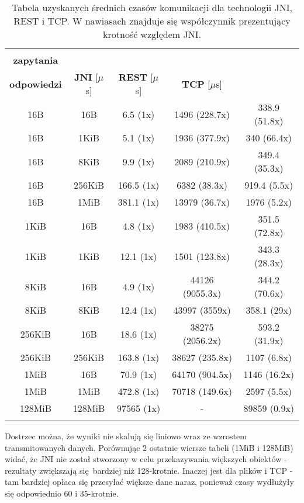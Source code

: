 \begin{longtable}{|c|c|c|c|c|}
    \hline
    \begin{tabular}{@{}c@{}} \textbf{Rozmiar} \\ \textbf{zapytania} \end{tabular} & \begin{tabular}{@{}c@{}} \textbf{Rozmiar} \\ \textbf{odpowiedzi} \end{tabular} & \textbf{JNI} [$\mu$s] & \textbf{REST} [$\mu$s] & \textbf{TCP} [$\mu$s] \\
    \hline
    16B & 16B & 6.5 (1x) & 1496 (228.7x) & 338.9 (51.8x) \\
    16B & 1KiB & 5.1 (1x) & 1936 (377.9x) & 340 (66.4x) \\
    16B & 8KiB & 9.9 (1x) & 2089 (210.9x) & 349.4 (35.3x) \\
    16B & 256KiB & 166.5 (1x) & 6382 (38.3x) & 919.4 (5.5x) \\
    16B & 1MiB & 381.1 (1x) & 13979 (36.7x) & 1976 (5.2x) \\
    1KiB & 16B & 4.8 (1x) & 1983 (410.5x) & 351.5 (72.8x) \\
    1KiB & 1KiB & 12.1 (1x) & 1501 (123.8x) & 343.3 (28.3x) \\
    8KiB & 16B & 4.9 (1x) & 44126 (9055.3x) & 344.2 (70.6x) \\
    8KiB & 8KiB & 12.4 (1x) & 43997 (3559x) & 358.1 (29x) \\
    256KiB & 16B & 18.6 (1x) & 38275 (2056.2x) & 593.2 (31.9x) \\
    256KiB & 256KiB & 163.8 (1x) & 38627 (235.8x) & 1107 (6.8x) \\
    1MiB & 16B & 70.9 (1x) & 64170 (904.5x) & 1146 (16.2x) \\
    1MiB & 1MiB & 472.8 (1x) & 70718 (149.6x) & 2597 (5.5x) \\
    128MiB & 128MiB & 97565 (1x) & - & 89859 (0.9x) \\
    \hline
    \caption{Tabela uzyskanych średnich czasów komunikacji dla technologii JNI, REST i TCP. W nawiasach znajduje się współczynnik prezentujący krotność względem JNI.}
    \label{tab:all_results2}
\end{longtable}


Dostrzec można, że wyniki nie skalują się liniowo wraz ze wzrostem transmitowanych danych. Porównując 2 ostatnie wiersze tabeli (1MiB i 128MiB) widać, że JNI nie został stworzony w celu przekazywania większych obiektów - rezultaty zwiększają się bardziej niż 128-krotnie. Inaczej jest dla plików i TCP - tam bardziej opłaca się przesyłać większe dane naraz, ponieważ czasy wydłużyły się odpowiednio 60 i 35-krotnie.
